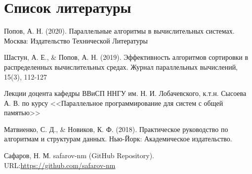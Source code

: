 \documentclass[a4paper, 14pt]{article}
\begin{document}
	\newpage
	\section*{\centering Список литературы}
	\begin{enumerate}[label={[\arabic*]}]
		\item Попов, А. Н. (2020). Параллельные алгоритмы в вычислительных системах. Москва: Издательство Технической Литературы
		\item Шастун, А. Е., \& Попов, А. Н. (2019). Эффективность алгоритмов сортировки в распределенных вычислительных средах. Журнал параллельных вычислений, 15(3), 112-127
		\item Лекции доцента кафедры ВВиСП ННГУ им. Н. И. Лобачевского, к.т.н. Сысоева А. В. по курсу <<Параллельное программирование для систем с общей памятью>>
		\item Матвиенко, С. Д., \& Новиков, К. Ф. (2018). Практическое руководство по алгоритмам и структурам данных. Нью-Йорк: Академическое издательство.
		\item Сафаров, Н. М. safarov-nm (GitHub Repository). URL:\href{https://github.com/safarov-nm}{https://github.com/safarov-nm}
	\end{enumerate}
	
	\newpage
\end{document}
